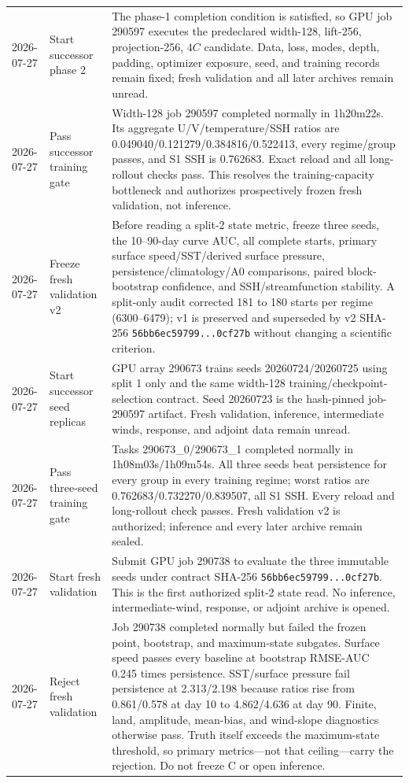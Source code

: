 \documentclass[11pt]{article}
\begin{document}
\begin{longtable}{@{}p{}p{}p{}@{}}
2026-07-27 & Start successor phase 2 & The phase-1 completion condition is satisfied, so GPU job 290597 executes the predeclared width-128, lift-256, projection-256, \(4C\) candidate.  Data, loss, modes, depth, padding, optimizer exposure, seed, and training records remain fixed; fresh validation and all later archives remain unread. \\
2026-07-27 & Pass successor training gate & Width-128 job 290597 completed normally in 1h20m22s.  Its aggregate U/V/temperature/SSH ratios are 0.049040/0.121279/0.384816/0.522413, every regime/group passes, and S1 SSH is 0.762683.  Exact reload and all long-rollout checks pass.  This resolves the training-capacity bottleneck and authorizes prospectively frozen fresh validation, not inference. \\
2026-07-27 & Freeze fresh validation v2 & Before reading a split-2 state metric, freeze three seeds, the 10--90-day curve AUC, all complete starts, primary surface speed/SST/derived surface pressure, persistence/climatology/A0 comparisons, paired block-bootstrap confidence, and SSH/streamfunction stability.  A split-only audit corrected 181 to 180 starts per regime (6300--6479); v1 is preserved and superseded by v2 SHA-256 \texttt{56bb6ec59799...0cf27b} without changing a scientific criterion. \\
2026-07-27 & Start successor seed replicas & GPU array 290673 trains seeds 20260724/20260725 using split 1 only and the same width-128 training/checkpoint-selection contract.  Seed 20260723 is the hash-pinned job-290597 artifact.  Fresh validation, inference, intermediate winds, response, and adjoint data remain unread. \\
2026-07-27 & Pass three-seed training gate & Tasks 290673\_0/290673\_1 completed normally in 1h08m03s/1h09m54s.  All three seeds beat persistence for every group in every training regime; worst ratios are 0.762683/0.732270/0.839507, all S1 SSH.  Every reload and long-rollout check passes.  Fresh validation v2 is authorized; inference and every later archive remain sealed. \\
2026-07-27 & Start fresh validation & Submit GPU job 290738 to evaluate the three immutable seeds under contract SHA-256 \texttt{56bb6ec59799...0cf27b}.  This is the first authorized split-2 state read.  No inference, intermediate-wind, response, or adjoint archive is opened. \\
2026-07-27 & Reject fresh validation & Job 290738 completed normally but failed the frozen point, bootstrap, and maximum-state subgates.  Surface speed passes every baseline at bootstrap RMSE-AUC 0.245 times persistence.  SST/surface pressure fail persistence at 2.313/2.198 because ratios rise from 0.861/0.578 at day 10 to 4.862/4.636 at day 90.  Finite, land, amplitude, mean-bias, and wind-slope diagnostics otherwise pass.  Truth itself exceeds the maximum-state threshold, so primary metrics---not that ceiling---carry the rejection.  Do not freeze C or open inference. \\

\end{longtable}
\end{document}
